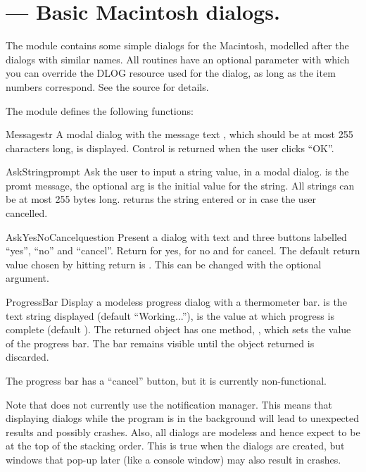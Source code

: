 \section{ ---
         Basic Macintosh dialogs.}



The  module contains some simple dialogs for
the Macintosh, modelled after the  dialogs with similar
names. All routines have an optional parameter  with which you
can override the DLOG resource used for the dialog, as long as the
item numbers correspond. See the source for details.
 
The  module defines the following functions:


\begin{funcdesc}{Message}{str}
A modal dialog with the message text , which should be at
most 255 characters long, is displayed. Control is returned when the
user clicks ``OK''.
\end{funcdesc}

\begin{funcdesc}{AskString}{prompt}
Ask the user to input a string value, in a modal dialog. 
is the promt message, the optional  arg is the initial
value for the string. All strings can be at most 255 bytes
long.  returns the string entered or 
in case the user cancelled.
\end{funcdesc}

\begin{funcdesc}{AskYesNoCancel}{question}
Present a dialog with text  and three buttons labelled
``yes'', ``no'' and ``cancel''. Return  for yes,  for
no and  for cancel. The default return value chosen by
hitting return is . This can be changed with the optional
 argument.
\end{funcdesc}

\begin{funcdesc}{ProgressBar}{}
Display a modeless progress dialog with a thermometer bar. 
is the text string displayed (default ``Working...''),  is
the value at which progress is complete (default ). The
returned object has one method, , which sets
the value of the progress bar. The bar remains visible until the
object returned is discarded.

The progress bar has a ``cancel'' button, but it is currently
non-functional.
\end{funcdesc}

Note that  does not currently use the notification
manager. This means that displaying dialogs while the program is in
the background will lead to unexpected results and possibly
crashes. Also, all dialogs are modeless and hence expect to be at the
top of the stacking order. This is true when the dialogs are created,
but windows that pop-up later (like a console window) may also result
in crashes.
